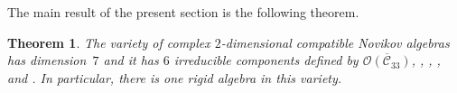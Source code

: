 \documentclass[pdftex]{sigma}
\numberwithin{equation}{section}
\newtheorem{Theorem}{Theorem}[section]
\begin{document}
The main result of the present section is the following theorem.

\begin{Theorem}\label{geo1}
The variety of complex $2$-dimensional compatible Novikov algebras has
dimension~$7$ and it has $6$ irreducible components defined by
$ \overline{\mathcal{O}( \mathcal{C}_{33})}$,
,
,
,
 and
.
In particular, there is one rigid algebra in this variety.

\end{Theorem}
\end{document}
